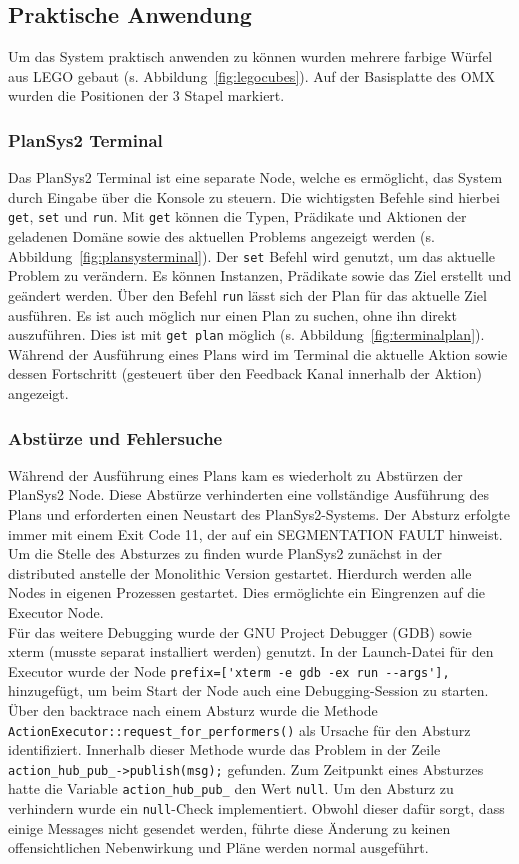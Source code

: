 \subsection{Praktische Anwendung}
Um das System praktisch anwenden zu können wurden mehrere farbige Würfel aus LEGO gebaut (s. Abbildung~\ref{fig:legocubes}).
Auf der Basisplatte des OMX wurden die Positionen der 3 Stapel markiert.
\subsubsection{PlanSys2 Terminal}
Das \ac{PlanSys2} Terminal ist eine separate Node, welche es ermöglicht, das System durch Eingabe über die Konsole zu steuern.
Die wichtigsten Befehle sind hierbei \verb|get|, \verb|set| und \verb|run|.
Mit \verb|get| können die Typen, Prädikate und Aktionen der geladenen Domäne sowie des aktuellen Problems angezeigt werden (s. Abbildung~\ref{fig:plansysterminal}).
Der \verb|set| Befehl wird genutzt, um das aktuelle Problem zu verändern.
Es können Instanzen, Prädikate sowie das Ziel erstellt und geändert werden.
Über den Befehl \verb|run| lässt sich der Plan für das aktuelle Ziel ausführen.
Es ist auch möglich nur einen Plan zu suchen, ohne ihn direkt auszuführen.
Dies ist mit \verb|get plan| möglich (s. Abbildung~\ref{fig:terminalplan}).\\
Während der Ausführung eines Plans wird im Terminal die aktuelle Aktion sowie dessen Fortschritt (gesteuert über den Feedback Kanal innerhalb der Aktion) angezeigt.
\subsubsection{Abstürze und Fehlersuche}
Während der Ausführung eines Plans kam es wiederholt zu Abstürzen der \ac{PlanSys2} Node.
Diese Abstürze verhinderten eine vollständige Ausführung des Plans und erforderten einen Neustart des \ac{PlanSys2}-Systems.
Der Absturz erfolgte immer mit einem Exit Code 11, der auf ein SEGMENTATION FAULT hinweist.
Um die Stelle des Absturzes zu finden wurde \ac{PlanSys2} zunächst in der distributed anstelle der Monolithic Version gestartet.
Hierdurch werden alle Nodes in eigenen Prozessen gestartet.
Dies ermöglichte ein Eingrenzen auf die Executor Node.\\
Für das weitere Debugging wurde der GNU Project Debugger (GDB) sowie xterm (musste separat installiert werden) genutzt.
In der Launch-Datei für den Executor wurde der Node \verb|prefix=['xterm -e gdb -ex run --args'],| hinzugefügt, um beim Start der Node auch eine Debugging-Session zu starten.\\
Über den backtrace nach einem Absturz wurde die Methode\\\verb|ActionExecutor::request_for_performers()| als Ursache für den Absturz identifiziert.
Innerhalb dieser Methode wurde das Problem in der Zeile\\\verb|action_hub_pub_->publish(msg);| gefunden.
Zum Zeitpunkt eines Absturzes hatte die Variable \verb|action_hub_pub_| den Wert \verb|null|.
Um den Absturz zu verhindern wurde ein \verb|null|-Check implementiert.
Obwohl dieser dafür sorgt, dass einige Messages nicht gesendet werden, führte diese Änderung zu keinen offensichtlichen Nebenwirkung und Pläne werden normal ausgeführt.

